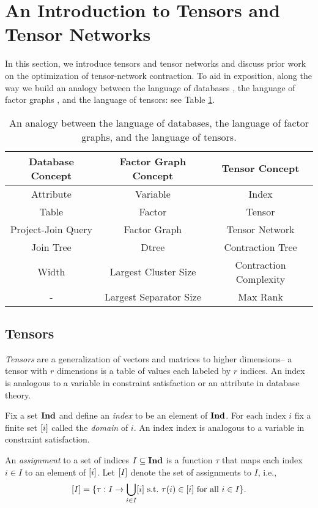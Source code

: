 \section{An Introduction to Tensors and Tensor Networks}
\label{sec:tensors:tensors}
In this section, we introduce tensors and tensor networks and discuss prior work on the optimization of tensor-network contraction. To aid in exposition, along the way we build an analogy between the language of databases \cite{SG88}, the language of factor graphs \cite{KFL01,dechter99,darwiche01b}, and the language of tensors: see Table \ref{table:db-tensor-analogy}.

\begin{table}[t]
\centering
\begin{tabular}{c|c|c}
\hline
\textbf{Database Concept} & \textbf{Factor Graph Concept} & \textbf{Tensor Concept}\\ \hline
Attribute & Variable & Index\\
Table & Factor & Tensor\\
Project-Join Query & Factor Graph & Tensor Network\\
Join Tree & Dtree & Contraction Tree\\ 
Width & Largest Cluster Size & Contraction Complexity \\
- & Largest Separator Size & Max Rank \\ \hline
\end{tabular}
\caption{\label{table:db-tensor-analogy} An analogy between the language of databases, the language of factor graphs, and the language of tensors.}
\end{table}

\subsection{Tensors}
\emph{Tensors} are a generalization of vectors and matrices to higher dimensions-- a tensor with $r$ dimensions is a table of values each labeled by $r$ indices. An index is analogous to a variable in constraint satisfaction or an attribute in database theory. 

Fix a set $\mathbf{Ind}$ and define an \emph{index} to be an element of $\mathbf{Ind}$. For each index $i$ fix a finite set $[i]$ called the \emph{domain} of $i$. An index index is analogous to a variable in constraint satisfaction. %

An \emph{assignment} to a set of indices $I \subseteq \mathbf{Ind}$ is a function $\tau$ that maps each index $i \in I$ to an element of $[i]$. Let $[I]$ denote the set of assignments to $I$, i.e., $$[I] = \{\tau: I \rightarrow \bigcup_{i \in I} [i]~\text{s.t.}~\tau(i) \in [i]~\text{for all}~i \in I\}.$$

